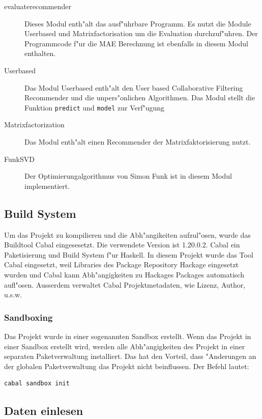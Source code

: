 \documentclass[a4paper, 12pt]{article}
\begin{document}
\begin{description}
\item[evaluaterecommender] Dieses Modul enth"alt das ausf"uhrbare Programm. Es nutzt die Module Userbased und Matrixfactorisation um die Evaluation durchzuf"uhren. Der Programmcode f"ur die MAE Berechnung ist ebenfalls in diesem Modul enthalten.
\item[Userbased] Das Modul Userbased enth"alt den User based Collaborative Filtering Recommender und die unpers"onlichen Algorithmen. Das Modul stellt die Funktion \verb|predict| und \verb|model| zur Verf"ugung
\item[Matrixfactorization] Das Modul enth"alt einen Recommender der Matrixfaktorisierung nutzt.
\item[FunkSVD] Der Optimierungalgorithmus von Simon Funk ist in diesem Modul implementiert.
\end{description}

\subsection{Build System}
\label{sec:cabal}

Um das Projekt zu kompilieren und die Abh"angikeiten aufzul"osen, wurde das Buildtool Cabal eingesesetzt. Die verwendete Version ist 1.20.0.2. Cabal ein Paketisierung und Build System f"ur Haskell. In diesem Projekt wurde das Tool Cabal eingesetzt, weil Libraries des Package Repository Hackage eingesetzt wurden und Cabal kann Abh"angigkeiten zu Hackages Packages automatisch aufl"osen. Ausserdem verwaltet Cabal Projektmetadaten, wie Lizenz, Author, u.s.w.

\subsubsection{Sandboxing}
\label{sec:sanboxing}

Das Projekt wurde in einer sogenannten Sandbox erstellt. Wenn das Projekt in einer Sandbox erstellt wird, werden alle Abh"angigkeiten des Projekt in einer separaten Paketverwaltung installiert. Das hat den Vorteil, dass "Anderungen an der globalen Paketverwaltung das Projekt nicht beinflussen. Der Befehl lautet:
\begin{verbatim}
cabal sandbox init
\end{verbatim}

\subsection{Daten einlesen}
\label{sec:readio}
\end{document}
